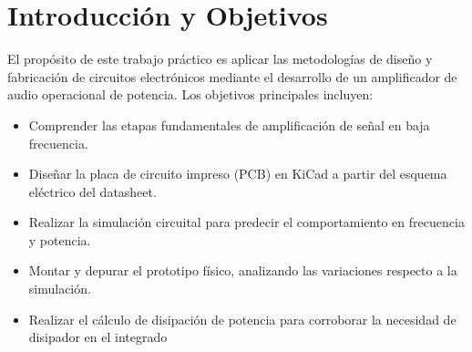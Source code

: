 \section{Introducción y Objetivos}
El propósito de este trabajo práctico es aplicar las metodologías de diseño y fabricación de circuitos electrónicos mediante el desarrollo de un amplificador de audio operacional de potencia. Los objetivos principales incluyen:
\begin{itemize}[label=\small\color{primary}$\blacksquare$]
    \item Comprender las etapas fundamentales de amplificación de señal en baja frecuencia.
    \item Diseñar la placa de circuito impreso (PCB) en KiCad a partir del esquema eléctrico del datasheet.
    \item Realizar la simulación circuital para predecir el comportamiento en frecuencia y potencia.
    \item Montar y depurar el prototipo físico, analizando las variaciones respecto a la simulación.
  \item Realizar el cálculo de disipación de potencia para corroborar la necesidad de disipador en el integrado
\end{itemize}